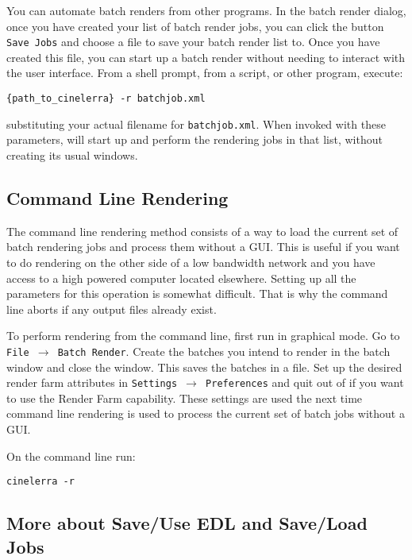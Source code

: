 You can automate \CGG{} batch renders from other programs.  In the batch render dialog, once you have created your list of batch render jobs, you can click the button \texttt{Save Jobs} and choose a file to save your batch render list to.  Once you have created this file, you can start up a batch render without needing to interact with the \CGG{} user interface.  From a shell prompt, from a script, or other program, execute:

\begin{lstlisting}[style=sh]
    {path_to_cinelerra} -r batchjob.xml
\end{lstlisting}
substituting  your actual filename for \texttt{batchjob.xml}.  When invoked with these parameters, \CGG{} will start up and perform the rendering jobs in that list, without creating its usual windows.

\subsection{Command Line Rendering}%
\label{sub:command_line_rendering}

The command line rendering method consists of a way to load the current set of batch rendering jobs and process them without a GUI. This is useful if you want to do rendering on the other side of a low bandwidth network and you have access to a high powered computer located elsewhere. Setting up all the parameters for this operation is somewhat difficult. That is why the command line aborts if any output files already exist.

To perform rendering from the command line, first run \CGG{} in graphical mode. Go to \texttt{File $\rightarrow$ Batch Render}. Create the batches you intend to render in the batch window and close the window. This saves the batches in a file. Set up the desired render farm attributes in \texttt{Settings $\rightarrow$ Preferences} and quit out of \CGG{} if you want to use the Render Farm capability.  These settings are used the next time command line rendering is used to process the current set of batch jobs without a GUI.

On the command line run:

\begin{lstlisting}[style=sh]
cinelerra -r
\end{lstlisting}

\subsection{More about Save/Use EDL and Save/Load Jobs}%
\label{sub:more_save_use_edl_jobs}

